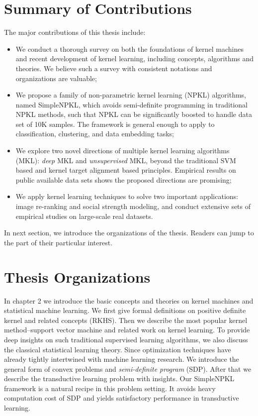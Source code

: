 \section{Summary of Contributions}

The major contributions of this thesis include:
\begin{itemize}
  \item We conduct a thorough survey on both the foundations of kernel machines and recent development of kernel learning, including concepts, algorithms and theories. We believe such a survey with consistent notations and organizations are valuable;
  \item We propose a family of non-parametric kernel learning (NPKL) algorithms, named SimpleNPKL, which avoids semi-definite programming in traditional NPKL methods, such that NPKL can be significantly boosted to handle data set of 10K samples. The framework is general enough to apply to classification, clustering, and data embedding tasks;
  \item We explore two novel directions of multiple kernel learning algorithms (MKL): {\em deep} MKL and {\em unsupervised} MKL, beyond the traditional SVM based and kernel target alignment based principles. Empirical results on public available data sets shows the proposed directions are promising;
  \item We apply kernel learning techniques to solve two important applications: image re-ranking and social strength modeling, and conduct extensive sets of empirical studies on large-scale real datasets.
\end{itemize}

In next section, we introduce the organizations of the thesis. Readers can jump to the part of their particular interest.



\section{Thesis Organizations}

In chapter 2 we introduce the basic concepts and theories on kernel machines and statistical machine learning. We first give formal definitions on positive definite kernel and related concepts (RKHS). Then we describe the most popular kernel method--support vector machine and related work on kernel learning. To provide deep insights on such traditional supervised learning algorithms, we also discuss the classical statistical learning theory. Since optimization techniques have already tightly intertwined with machine learning research. We introduce the general form of convex problems and {\em semi-definite program} (SDP). After that we describe the transductive learning problem with insights. Our SimpleNPKL framework is a natural recipe in this problem setting. It avoids heavy computation cost of SDP and yields satisfactory performance in transductive learning.

